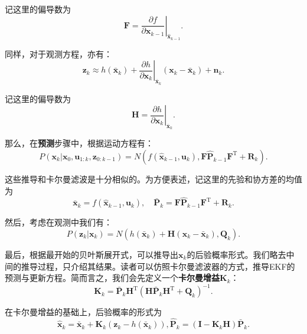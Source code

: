 记这里的偏导数为
\begin{equation}
\bm{F} = \left. {\frac{{\partial f}}{{\partial {\bm{x}_{k - 1}}}}} \right|_{{{\bm{\hat x}}_{k - 1}}}.
\end{equation}

同样，对于观测方程，亦有：
\begin{equation}
{\bm{z}_k} \approx h\left( {{{\bm{\bar x}}_k}} \right) + {\left. {\frac{{\partial h}}{{\partial {\bm{x}_k}}}} \right|_{{{\bm{\bar x}}_k}}}\left( {\bm{x}_k - {{\bm{\bar x}}_k}} \right) + {\bm{n}_k}.
\end{equation}

记这里的偏导数为
\begin{equation}
\bm{H} = \left. {\frac{{\partial h}}{{\partial {\bm{x}_k}}}} \right|_{{{\bm{\bar x}}_k}}.
\end{equation}

那么，在\textbf{预测}步骤中，根据运动方程有：
\begin{equation}
P\left( {{\bm{x}_k}|{\bm{x}_0},{\bm{u}_{1:k}},{\bm{z}_{0:k - 1}}} \right)
 = N(f\left( {{{\bm{\hat x}}_{k - 1}},{\bm{u}_k}} \right), \bm{F}\bm{\hat{P}}_{k-1} \bm{F}^\mathrm{T} + \bm{R}_k).
\end{equation}

这些推导和卡尔曼滤波是十分相似的。为方便表述，记这里的先验和协方差的均值为
\begin{equation}
\bm{\bar {x}}_k = f\left( {{{\bm{\hat x}}_{k - 1}},{\bm{u}_k}} \right), \quad \bm{\bar{P}}_k = \bm{F}\bm{\hat{P}}_{k-1} \bm{F}^\mathrm{T} + \bm{R}_k.
\end{equation}

然后，考虑在观测中我们有：
\begin{equation}
P\left( {{\bm{z}_k}|{\bm{x}_k}} \right) = N( h\left( {{{\bm{\bar x}}_k}} \right) + \bm{H} \left( {\bm{x}_k - {{\bm{\bar x}}_k}} \right), \bm{Q}_k ).
\end{equation}

最后，根据最开始的贝叶斯展开式，可以推导出$\bm{x}_k$的后验概率形式。我们略去中间的推导过程，只介绍其结果。读者可以仿照卡尔曼滤波器的方式，推导EKF的预测与更新方程。简而言之，我们会先定义一个\textbf{卡尔曼增益}$\bm{K}_k$：
\begin{equation}
\bm{K}_k = {\bm{\bar{P}}_{k}}{\bm{H}^\mathrm{T}}{\left( {\bm{H}{\bm{\bar P}_k}{\bm{H}^\mathrm{T}} + {\bm{Q}_k}} \right)^{ - 1}}.
\end{equation}

在卡尔曼增益的基础上，后验概率的形式为
\begin{equation}
{{\bm{\hat x}}_k} = {{\bm{\bar x}}_k} + {\bm{K}_k}\left( {{\bm{z}_k} - h\left( {{\bm{\bar x}_k}} \right)} \right),{\bm{\hat P}_k} = \left( {\bm{I} - {\bm{K}_k}{\bm{H}}} \right) \bm{\bar{P}}_k.
\end{equation}

